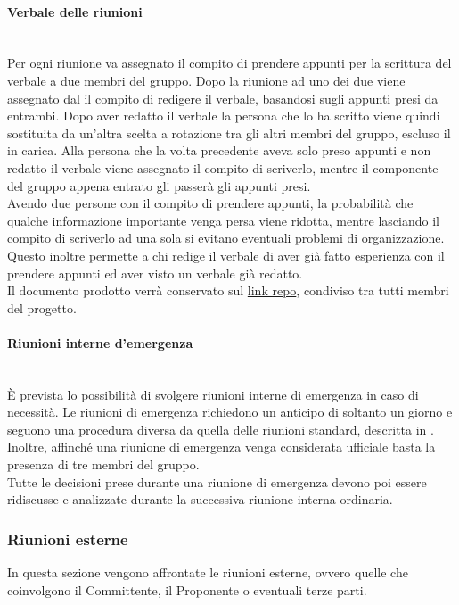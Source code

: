 \paragraph{Verbale delle riunioni}\label{sec:verbale_riunioni_interne}\mbox{}\\
Per ogni riunione va assegnato il compito di prendere appunti per la scrittura del verbale a due membri del gruppo. Dopo la riunione ad uno dei due viene assegnato dal \Responsabile{} il compito di redigere il verbale, basandosi sugli appunti presi da entrambi. Dopo aver redatto il verbale la persona che lo ha scritto viene quindi sostituita da un'altra scelta a rotazione tra gli altri membri del gruppo, escluso il \Responsabile{} in carica. Alla persona che la volta precedente aveva solo preso appunti e non redatto il verbale viene assegnato il compito di scriverlo, mentre il componente del gruppo appena entrato gli passerà gli appunti presi.\\
Avendo due persone con il compito di prendere appunti, la probabilità che qualche informazione importante venga persa viene ridotta, mentre lasciando il compito di scriverlo ad una sola si evitano eventuali problemi di organizzazione.
Questo inoltre permette a chi redige il verbale di aver già fatto esperienza con il prendere appunti ed aver visto un verbale già redatto.\\
Il documento prodotto verrà conservato sul  \url{link repo}, condiviso tra tutti membri del progetto.

\paragraph{Riunioni interne d'emergenza}\label{sec:riunioni_emergenza}\mbox{}\\
\`{E} prevista lo possibilità di svolgere riunioni interne di emergenza in caso di necessità. Le riunioni di emergenza richiedono un anticipo di soltanto un giorno e seguono una procedura diversa da quella delle riunioni standard, descritta in . Inoltre, affinché una riunione di emergenza venga considerata ufficiale basta la presenza di tre membri del gruppo.\\
Tutte le decisioni prese durante una riunione di emergenza devono poi essere ridiscusse e analizzate durante la successiva riunione interna ordinaria.

\subsubsection{Riunioni esterne}
In questa sezione vengono affrontate le riunioni esterne, ovvero quelle che coinvolgono il Committente, il Proponente o eventuali terze parti.

